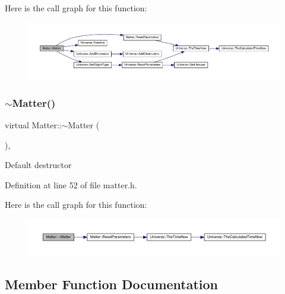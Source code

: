 Here is the call graph for this function\+:
\nopagebreak
\begin{figure}[H]
\begin{center}
\leavevmode
\includegraphics[width=350pt]{class_matter_a724543a0439d3099f5fc0eae68110b75_cgraph}
\end{center}
\end{figure}
\mbox{\label{class_matter_a646fca3d4176950aed6173e1378664e3}} 
\subsubsection{\texorpdfstring{$\sim$\+Matter()}{~Matter()}}
{\footnotesize\ttfamily virtual Matter\+::$\sim$\+Matter (\begin{DoxyParamCaption}{ }\end{DoxyParamCaption})\hspace{0.3cm}{\ttfamily [inline]}, {\ttfamily [virtual]}}

Default destructor 

Definition at line 52 of file matter.\+h.

Here is the call graph for this function\+:\nopagebreak
\begin{figure}[H]
\begin{center}
\leavevmode
\includegraphics[width=350pt]{class_matter_a646fca3d4176950aed6173e1378664e3_cgraph}
\end{center}
\end{figure}


\subsection{Member Function Documentation}
\mbox{\label{class_matter_ac667a2f3b6d5d2ce8469efe1596cdd62}} 
